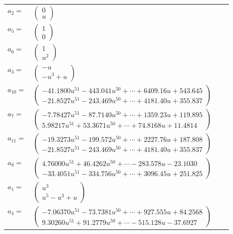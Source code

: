 \documentclass[1p]{elsarticle_modified}
\theoremstyle{definition}
\begin{document}
\begin{tabular}{m{7pt} m{180pt} m{7pt} m{180pt} }
\flushright $a_{2}=$&$\begin{pmatrix}0\\u\end{pmatrix}$ \\
\flushright $a_{5}=$&$\begin{pmatrix}1\\0\end{pmatrix}$ \\
\flushright $a_{6}=$&$\begin{pmatrix}1\\u^2\end{pmatrix}$ \\
\flushright $a_{3}=$&$\begin{pmatrix}- u\\- u^3+u\end{pmatrix}$ \\
\flushright $a_{10}=$&$\begin{pmatrix}-41.1800 u^{51}-443.041 u^{50}+\cdots+6409.16 u+543.645\\-21.8527 u^{51}-243.469 u^{50}+\cdots+4181.40 u+355.837\end{pmatrix}$ \\
\flushright $a_{7}=$&$\begin{pmatrix}-7.78427 u^{51}-87.7140 u^{50}+\cdots+1359.23 u+119.895\\5.98217 u^{51}+53.3671 u^{50}+\cdots+74.8168 u+11.4814\end{pmatrix}$ \\
\flushright $a_{11}=$&$\begin{pmatrix}-19.3273 u^{51}-199.572 u^{50}+\cdots+2227.76 u+187.808\\-21.8527 u^{51}-243.469 u^{50}+\cdots+4181.40 u+355.837\end{pmatrix}$ \\
\flushright $a_{8}=$&$\begin{pmatrix}4.76000 u^{51}+46.4262 u^{50}+\cdots-283.578 u-23.1030\\-33.4051 u^{51}-334.756 u^{50}+\cdots+3096.45 u+251.825\end{pmatrix}$ \\
\flushright $a_{1}=$&$\begin{pmatrix}u^3\\u^5- u^3+u\end{pmatrix}$ \\
\flushright $a_{4}=$&$\begin{pmatrix}-7.06370 u^{51}-73.7381 u^{50}+\cdots+927.555 u+84.2568\\9.30260 u^{51}+91.2779 u^{50}+\cdots-515.128 u-37.6927\end{pmatrix}$ \\

\end{tabular}
\end{document}
